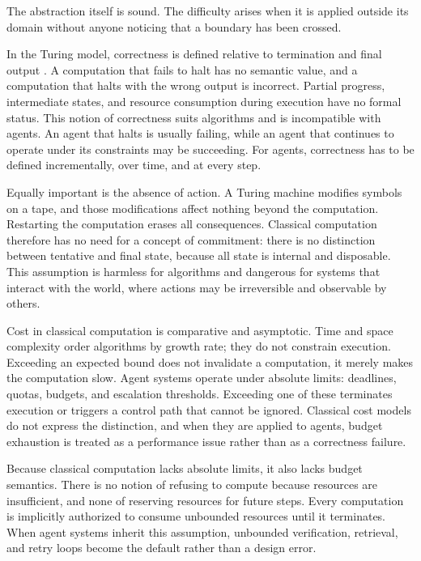 \documentclass[11pt]{book}
\begin{document}
The abstraction itself is sound. The difficulty arises when it is applied outside its domain without anyone noticing that a boundary has been crossed.

In the Turing model, correctness is defined relative to termination and final output \cite{turing1936computable}. A computation that fails to halt has no semantic value, and a computation that halts with the wrong output is incorrect. Partial progress, intermediate states, and resource consumption during execution have no formal status. This notion of correctness suits algorithms and is incompatible with agents. An agent that halts is usually failing, while an agent that continues to operate under its constraints may be succeeding. For agents, correctness has to be defined incrementally, over time, and at every step.

Equally important is the absence of action. A Turing machine modifies symbols on a tape, and those modifications affect nothing beyond the computation. Restarting the computation erases all consequences. Classical computation therefore has no need for a concept of commitment: there is no distinction between tentative and final state, because all state is internal and disposable. This assumption is harmless for algorithms and dangerous for systems that interact with the world, where actions may be irreversible and observable by others.

Cost in classical computation is comparative and asymptotic. Time and space complexity order algorithms by growth rate; they do not constrain execution. Exceeding an expected bound does not invalidate a computation, it merely makes the computation slow. Agent systems operate under absolute limits: deadlines, quotas, budgets, and escalation thresholds. Exceeding one of these terminates execution or triggers a control path that cannot be ignored. Classical cost models do not express the distinction, and when they are applied to agents, budget exhaustion is treated as a performance issue rather than as a correctness failure.

Because classical computation lacks absolute limits, it also lacks budget semantics. There is no notion of refusing to compute because resources are insufficient, and none of reserving resources for future steps. Every computation is implicitly authorized to consume unbounded resources until it terminates. When agent systems inherit this assumption, unbounded verification, retrieval, and retry loops become the default rather than a design error.
\end{document}
